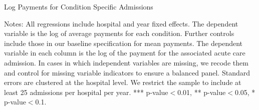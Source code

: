 \documentclass[12pt]{article}
\begin{document}
\newpage
{}
\setlength{\captionmargin}{.5 \textwidth} \addtolength{\captionmargin}{-.5\wd\gfxbox}
\begin{table}[!h]
\centering
\caption{Log Payments for Condition Specific Admissions}
\label{tab:eachcondition}
\usebox{\gfxbox}
\par
\begin{minipage}{\wd\gfxbox}
\footnotesize
Notes: All regressions include hospital and year fixed effects.  The dependent variable is the log of average payments for each condition.  Further controls include those in our baseline specification for mean payments.  The dependent variable in each column is the log of the payment for the associated acute care admission.  In cases in which independent variables are missing, we recode them and control for missing variable indicators to ensure a balanced panel.  Standard errors are clustered at the hospital level.  We restrict the sample to include at least 25 admissions per hospital per year.  *** p-value$<$0.01, ** p-value$<$0.05, * p-value$<$0.1.
\end{minipage}
\end{table}
\end{document}

